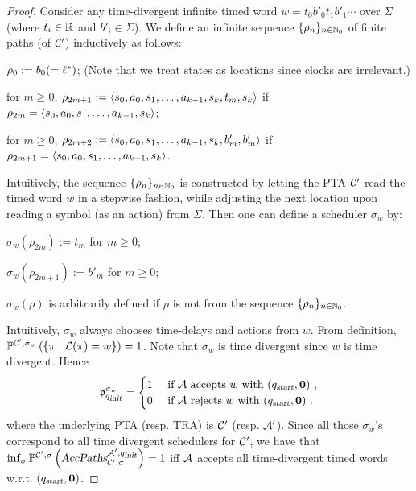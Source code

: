 \begin{proof}
Consider any time-divergent infinite timed word $ w = t_0 b'_0 t_1 b'_1 \cdots $ over $\Sigma$ (where $t_i\in\mathbb{R}$ and $b'_i\in\Sigma$).
We define an infinite sequence $\{\rho_n\}_{n\in\mathbb{N}_0}$ of finite paths (of $\mathcal{C}'$) inductively as follows:
\begin{compactitem}
\item $\rho_0:=b_0(=\ell^*)$; (Note that we treat states as locations since clocks are irrelevant.)
\item for $m\ge 0$, $\rho_{2m+1}:=\left\langle s_0,a_0,s_1,\dots,a_{k-1},s_{k},t_{m}, s_{k}\right\rangle$ if $\rho_{2m}=\left\langle s_0,a_0,s_1,\dots,a_{k-1},s_{k}\right\rangle$;
\item for $m\ge 0$, $\rho_{2m+2}:=\left\langle s_0,a_0,s_1,\dots,a_{k-1},s_{k},b'_{m}, b'_m\right\rangle$ if $\rho_{2m+1}=\left\langle s_0,a_0,s_1,\dots,a_{k-1},s_{k}\right\rangle$.
\end{compactitem}
Intuitively, the sequence $\{\rho_n\}_{n\in\mathbb{N}_0}$ is constructed by letting the PTA $\mathcal{C}'$ read the timed word $w$ in a stepwise fashion, while adjusting the next location upon reading a symbol (as an action) from $\Sigma$.
Then one can define a scheduler $\sigma_w$ by:
\begin{compactitem}
\item $\sigma_w(\rho_{2m}):=t_m$ for $m\ge 0$;
\item $\sigma_w(\rho_{2m+1}):=b'_{m}$ for $m\ge 0$;
\item $\sigma_w(\rho)$ is arbitrarily defined if $\rho$ is not from the sequence $\{\rho_n\}_{n\in\mathbb{N}_0}$.
\end{compactitem}
Intuitively, $\sigma_w$ always chooses time-delays and actions from $w$.
From definition,
$
    \mathbb{P}^{\mathcal{C}',\sigma_w }\left(
        \left \{\pi\mid \mathcal{L}(\pi)=w
        \right \}
    \right)
    = 1
$.
Note that $\sigma_w$ is time divergent since $w$ is time divergent.
Hence
$$
    \mathfrak{p}_{q_{\mbox{\sl\scriptsize init} }}^{\sigma_w}
        =   \begin{cases}
            1 & \mbox{ if $\mathcal{A}$ accepts $w$ with $(q_{\mbox{\sl\scriptsize start}},\mathbf{0})$ },\\
            0 & \mbox{ if $\mathcal{A}$ rejects $w$ with $(q_{\mbox{\sl\scriptsize start}},\mathbf{0})$ }.
        \end{cases}
$$
where the underlying PTA (resp. TRA) is $\mathcal{C}'$ (resp. $\mathcal{A}'$).
Since all those $\sigma_w$'s correspond to all time divergent schedulers for $\mathcal{C}'$, 
we have that
$
\inf_\sigma \mathbb{P}^{\mathcal{C}',\sigma}\left(
    \mbox{\sl AccPaths} _{\mathcal{C}',\sigma} ^{\mathcal{A}',q_{\mbox{\sl\scriptsize init} }}
\right)
    = 1
$
iff
$\mathcal{A}$ accepts all time-divergent timed words w.r.t. $(q_{\mbox{\sl\scriptsize start}},\mathbf{0})$.
\end{proof}
